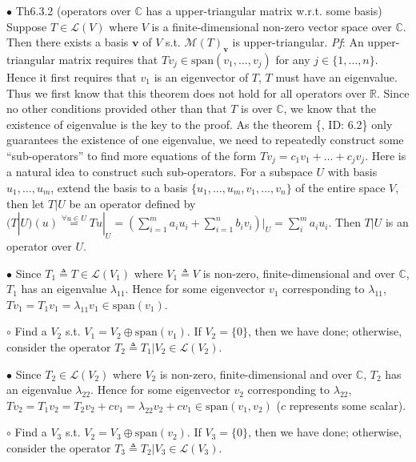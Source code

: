\documentclass{article}
\begin{document}
\begin{Th}{$\bullet$ Th6.3.2 (operators over $\mathbb{C}$ has a upper-triangular matrix w.r.t. some basis)}
    Suppose $T\in\mathcal{L}(V)$ where $V$ is a finite-dimensional non-zero vector space over $\mathbb{C}$. Then there exists a basis $\pmb{v}$ of $V$ s.t. $\mathcal{M}(T)_{\pmb{v}}$ is upper-triangular.
    \tcblower
    \textit{Pf}: An upper-triangular matrix requires that $Tv_j\in\text{span}(v_1, \dots, v_j)$ for any $j\in\{1, \dots, n\}$. Hence it first requires that $v_1$ is an eigenvector of $T$, $T$ must have an eigenvalue. Thus we first know that this theorem does not hold for all operators over $\mathbb{R}$. Since no other conditions provided other than that $T$ is over $\mathbb{C}$, we know that the existence of eigenvalue is the key to the proof. As the theorem \{, ID: 6.2\} only guarantees the existence of one eigenvalue, we need to repeatedly construct some ``sub-operators'' to find more equations of the form $Tv_j = c_1v_1 + \dots + c_jv_j$. Here is a natural idea to construct such sub-operators. For a subspace $U$ with basis $u_1, \dots, u_m$, extend the basis to a basis $\{u_1, \dots, u_m, v_1, \dots, v_n\}$ of the entire space $V$, then let $T|U$ be an operator defined by $(T|U)(u) \overset{\forall u\in U}{=} Tu|_U = (\sum_{i=1}^{m}a_iu_i + \sum_{i=1}^{n}b_iv_i)|_U = \sum_{i}^{m}a_iu_i$. Then $T|U$ is an operator over $U$.
    \begin{compactenum}
        \item[$\bullet$] Since $T_1\triangleq T\in\mathcal{L}(V_1)$ where $V_1 \triangleq V$ is non-zero, finite-dimensional and over $\mathbb{C}$, $T_1$ has an eigenvalue $\lambda_{11}$. Hence for some eigenvector $v_1$ corresponding to $\lambda_{11}$, $Tv_1 = T_1v_1 = \lambda_{11}v_1\in\text{span}(v_1)$.  
        \item[$\circ$] Find a $V_2$ s.t. $V_1 = V_2 \oplus \text{span}(v_1)$. If $V_2 = \{0\}$, then we have done; otherwise, consider the operator $T_2\triangleq T_1|V_2\in\mathcal{L}(V_2)$. 
        \item[$\bullet$] Since $T_2\in\mathcal{L}(V_2)$ where $V_2$ is non-zero, finite-dimensional and over $\mathbb{C}$, $T_2$ has an eigenvalue $\lambda_{22}$. Hence for some eigenvector $v_2$ corresponding to $\lambda_{22}$, $Tv_2 = T_1v_2 = T_2v_2 + cv_1 = \lambda_{22}v_2 + cv_1\in\text{span}(v_1, v_2)$ ($c$ represents some scalar).
        \item[$\circ$] Find a $V_3$ s.t. $V_2 = V_3 \oplus \text{span}(v_2)$. If $V_3=\{0\}$, then we have done; otherwise, consider the operator $T_3\triangleq T_2|V_3\in\mathcal{L}(V_3)$.

\end{compactenum}
\end{Th}
\end{document}
